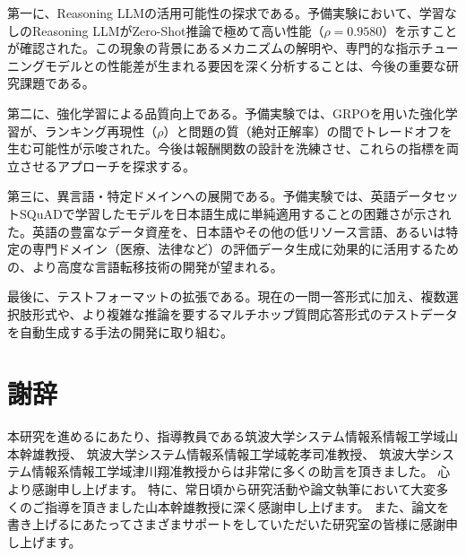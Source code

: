 \documentclass[a4paper,11pt]{jreport}
\begin{document}
第一に、Reasoning LLMの活用可能性の探求である。予備実験において、学習なしのReasoning LLMがZero-Shot推論で極めて高い性能（$\rho = 0.9580$）を示すことが確認された。この現象の背景にあるメカニズムの解明や、専門的な指示チューニングモデルとの性能差が生まれる要因を深く分析することは、今後の重要な研究課題である。

第二に、強化学習による品質向上である。予備実験では、GRPOを用いた強化学習が、ランキング再現性（$\rho$）と問題の質（絶対正解率）の間でトレードオフを生む可能性が示唆された。今後は報酬関数の設計を洗練させ、これらの指標を両立させるアプローチを探求する。

第三に、異言語・特定ドメインへの展開である。予備実験では、英語データセットSQuADで学習したモデルを日本語生成に単純適用することの困難さが示された。英語の豊富なデータ資産を、日本語やその他の低リソース言語、あるいは特定の専門ドメイン（医療、法律など）の評価データ生成に効果的に活用するための、より高度な言語転移技術の開発が望まれる。

最後に、テストフォーマットの拡張である。現在の一問一答形式に加え、複数選択肢形式や、より複雑な推論を要するマルチホップ質問応答形式のテストデータを自動生成する手法の開発に取り組む。

\chapter*{謝辞}
本研究を進めるにあたり、指導教員である筑波大学システム情報系情報工学域山本幹雄教授、
筑波大学システム情報系情報工学域乾孝司准教授、
筑波大学システム情報系情報工学域津川翔准教授からは非常に多くの助言を頂きました。
心より感謝申し上げます。
特に、常日頃から研究活動や論文執筆において大変多くのご指導を頂きました山本幹雄教授に深く感謝申し上げます。
また、論文を書き上げるにあたってさまざまサポートをしていただいた研究室の皆様に感謝申し上げます。

\newpage
{}
\renewcommand{\bibname}{参考文献}
\end{document}
